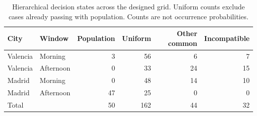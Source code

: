 \begin{table}[htbp]\centering\small
\caption{Hierarchical decision states across the designed grid. Uniform counts exclude cases already passing with population. Counts are not occurrence probabilities.}\label{tab:stages}
\begin{tabular}{llrrrr}\toprule City & Window & Population & Uniform & Other common & Incompatible\\\midrule
Valencia & Morning & 3 & 56 & 6 & 7\\
Valencia & Afternoon & 0 & 33 & 24 & 15\\
Madrid & Morning & 0 & 48 & 14 & 10\\
Madrid & Afternoon & 47 & 25 & 0 & 0\\
\midrule Total & & 50 & 162 & 44 & 32\\\bottomrule\end{tabular}\end{table}